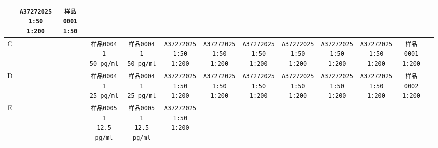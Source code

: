 \documentclass[UTF8,10pt,a4paper,fontset=fandol]{ctexart}
\begin{document}
\begin{center}
{\begin{tabular}{c|c|c|c|c|c|c|c|c|c|c|c|c}
  & \texttt{A37272025\\1:50\\1:200}
  & \texttt{样品0001\\1:50}
  & \\
\hline
C & &
  & \texttt{样品0004\\1\\50 pg/ml}
  & \texttt{样品0004\\1\\50 pg/ml}
  & \texttt{A37272025\\1:50\\1:200}
  & \texttt{A37272025\\1:50\\1:200}
  & \texttt{A37272025\\1:50\\1:200}
  & \texttt{A37272025\\1:50\\1:200}
  & \texttt{A37272025\\1:50\\1:200}
  & \texttt{A37272025\\1:50\\1:200}
  & \texttt{样品0001\\1:200}
  & \\
\hline
D & &
  & \texttt{样品0004\\1\\25 pg/ml}
  & \texttt{样品0004\\1\\25 pg/ml}
  & \texttt{A37272025\\1:50\\1:200}
  & \texttt{A37272025\\1:50\\1:200}
  & \texttt{A37272025\\1:50\\1:200}
  & \texttt{A37272025\\1:50\\1:200}
  & \texttt{A37272025\\1:50\\1:200}
  & \texttt{A37272025\\1:50\\1:200}
  & \texttt{样品0002\\1:200}
  & \\
\hline
E & &
  & \texttt{样品0005\\1\\12.5 pg/ml}
  & \texttt{样品0005\\1\\12.5 pg/ml}
  & \texttt{A37272025\\1:50\\1:200}

\end{tabular}}
\end{center}
\end{document}
